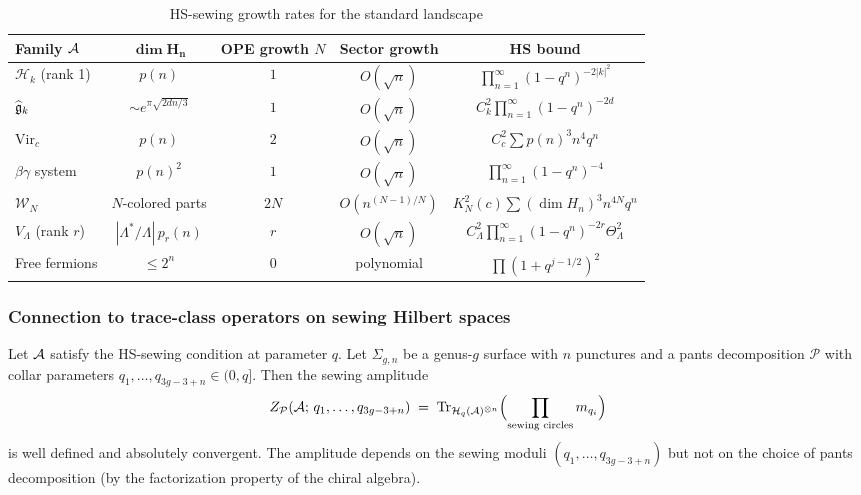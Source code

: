\begin{table}[ht]
\centering
\caption{HS-sewing growth rates for the standard landscape}
\label{tab:thqg-I-hs-growth}
\renewcommand{\arraystretch}{1.4}
{\footnotesize
\begin{tabular}{|l|c|c|c|c|}
\hline
\textbf{Family $\mathcal{A}$} & $\boldsymbol{\dim H_n}$ & \textbf{OPE growth $N$} & \textbf{Sector growth} & \textbf{HS bound} \\
\hline
$\mathcal{H}_k$ (rank 1) & $p(n)$ & $1$ & $O(\sqrt{n})$ & $\prod_{n=1}^\infty (1-q^n)^{-2|k|^2}$ \\
\hline
$\widehat{\mathfrak{g}}_k$ & $\sim e^{\pi\sqrt{2dn/3}}$ & $1$ & $O(\sqrt{n})$ & $C_k^2\prod_{n=1}^\infty (1-q^n)^{-2d}$ \\
\hline
$\mathrm{Vir}_c$ & $p(n)$ & $2$ & $O(\sqrt{n})$ & $C_c^2\sum p(n)^3 n^4 q^n$ \\
\hline
$\beta\gamma$ system & $p(n)^2$ & $1$ & $O(\sqrt{n})$ & $\prod_{n=1}^\infty (1-q^n)^{-4}$ \\
\hline
$\mathcal{W}_N$ & $N$-colored parts & $2N$ & $O(n^{(N-1)/N})$ & $K_N^2(c)\sum (\dim H_n)^3 n^{4N} q^n$ \\
\hline
$V_\Lambda$ (rank $r$) & $|\Lambda^*/\Lambda|\,p_r(n)$ & $r$ & $O(\sqrt{n})$ & $C_\Lambda^2\prod_{n=1}^\infty (1-q^n)^{-2r}\Theta_\Lambda^2$ \\
\hline
Free fermions & $\leq 2^n$ & $0$ & polynomial & $\prod (1+q^{j-1/2})^2$ \\
\hline
\end{tabular}}
\end{table}

\subsubsection{Connection to trace-class operators on sewing Hilbert spaces}

\begin{proposition}
\label{prop:thqg-I-trace-class-amplitudes}
Let\/ $\mathcal{A}$ satisfy the HS-sewing condition at parameter $q$. Let $\Sigma_{g,n}$ be a genus-$g$ surface with $n$ punctures and a pants decomposition $\mathcal{P}$ with collar parameters $q_1, \ldots, q_{3g-3+n} \in (0,q]$. Then the sewing amplitude
\begin{equation}\label{eq:thqg-I-sewing-amplitude}
Z_{\mathcal{P}}(\mathcal{A};\, q_1, \ldots, q_{3g-3+n}) \;=\; \operatorname{Tr}_{\mathcal{H}_q(\mathcal{A})^{\otimes n}} \Bigl( \prod_{\text{sewing circles}} m_{q_i} \Bigr)
\end{equation}
is well defined and absolutely convergent. The amplitude depends on the sewing moduli $(q_1, \ldots, q_{3g-3+n})$ but not on the choice of pants decomposition (by the factorization property of the chiral algebra).
\end{proposition}

